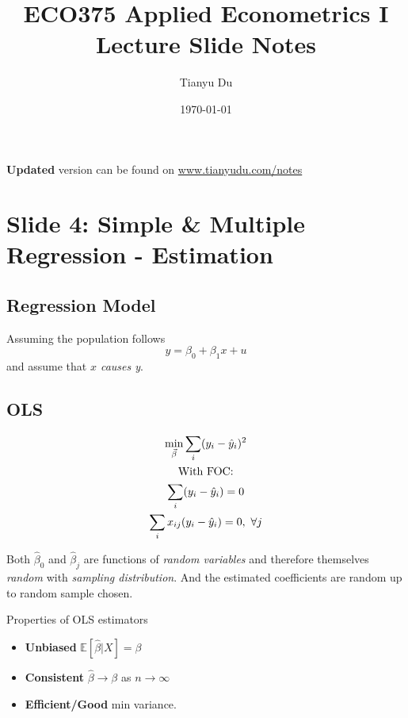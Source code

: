 \documentclass[]{article}
\title{ECO375 Applied Econometrics I \\ \small Lecture Slide Notes}
\author{Tianyu Du}
\date{\today}
\begin{document}
	\maketitle
	\doclicenseThis
	\textbf{Updated} version can be found on \url{www.tianyudu.com/notes}
	
	\tableofcontents
	\section{Slide 4: Simple \& Multiple Regression - Estimation}
	\subsection{Regression Model}
	\begin{assumption}
	    Assuming the population follows
	    \[
	        y = \beta_0 + \beta_1 x + u
	    \]
	    and assume that \emph{$x$ causes y}.
	\end{assumption}
	
	\subsection{OLS}
	\begin{gather*}
	    \min_{\vec{\beta}} \sum_{i} (y_i - \hat{y}_i)^2 \\
	    \text{{With FOC:}} \\
	    \sum_{i}(y_i - \hat{y}_i) = 0 \\
	    \sum_{i}x_{ij}(y_i - \hat{y}_i) = 0,\ \forall j
	\end{gather*}
	
	\begin{remark}
	    Both $\hat{\beta}_0$ and $\hat{\beta}_j$ are functions of \emph{random variables} and therefore themselves \emph{random} with \emph{sampling distribution}. And the estimated coefficients are random up to random sample chosen.
	\end{remark}
	
	\begin{property}
	    Properties of OLS estimators
	    \begin{itemize}
	        \item \textbf{Unbiased} $\mathbb{E}[\hat{\beta} | X] = \beta$
	        \item \textbf{Consistent} $\hat{\beta} \to \beta$ as $n \to \infty$
	        \item \textbf{Efficient/Good} min variance.
	    \end{itemize}
	\end{property}
	
\end{document}
